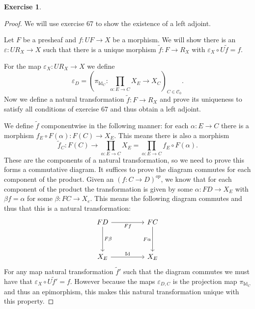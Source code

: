 \documentclass{article}
\DeclareMathOperator{\Id}{Id}
\newcommand{\cat}{\mathcal{C}}
\theoremstyle{definition}
\newtheorem{question}{Exercise}
\begin{document}
\begin{question}
\begin{enumerate}[(a)]
\begin{proof}
                  We will use exercise 67 to show the existence of a left
                  adjoint.

                  Let \(F\) be a presheaf and \(f:UF\to X\) be a morphism. We
                  will show there is an \(\varepsilon:UR_{X}\to X\) such that
                  there is a unique morphism \(\tilde{f}:F\to R_{X}\) with
                  \(\varepsilon_{X}\circ U\tilde{f}=f\).

                  For the map \(\varepsilon_{X}:UR_{X}\to X\) we define
                  \[
                      \varepsilon_{D}=\left(\pi_{\Id_{C}}:\prod_{\alpha:E\to C}X_{E}\to X_{C}\right)_{C\in\cat_{0}}.
                  \]
                  Now we define a natural transformation \(\tilde{f}:F\to
                  R_{X}\) and prove its uniqueness to satisfy all conditions of
                  exercise 67 and thus obtain a left adjoint.

                  We define \(\tilde{f}\) componentwise in the following manner:
                  for each \(\alpha:E\to C\) there is a morphism \(f_{E}\circ
                  F(\alpha):F(C)\to X_{E}\). This means there is also a morphism
                  \[
                      \tilde{f}_{C}:F(C)\to\prod_{\alpha:E\to C}X_{E}=\prod_{\alpha:E\to C}f_{E}\circ F(\alpha).
                  \]
                  These are the components of a natural transformation, so we
                  need to prove this forms a commutative diagram. It suffices to
                  prove the diagram commutes for each component of the product.
                  Given an \((f:C\to D)^{op}\), we know that for each component
                  of the product the transformation is given by some
                  \(\alpha:FD\to X_{E}\) with \(\beta f=\alpha\) for some
                  \(\beta:FC\to X_{e}\). This means the following diagram
                  commutes and thus that this is a natural transformation:
                  \[
                      \begin{tikzcd}[ampersand replacement=\&]
                          FD \&\& FC \\
                          \\
                          {X_{E}} \&\& {X_{E}}
                          \arrow["Ff"', from=1-1, to=1-3]
                          \arrow["F\beta", from=1-1, to=3-1]
                          \arrow["\Id", from=3-1, to=3-3]
                          \arrow["F\alpha"', from=1-3, to=3-3]
                      \end{tikzcd}
                  \]
                  For any map natural transformation \(\tilde{f}'\) such that
                  the diagram commutes we must have that \(\varepsilon_{X}\circ
                  U\tilde{f}'=f\). However because the maps
                  \(\varepsilon_{D,C}\) is the projection map \(\pi_{\Id_{C}}\)
                  and thus an epimorphism, this makes this natural
                  transformation unique with this property.


\end{proof}
\end{enumerate}
\end{question}
\end{document}
